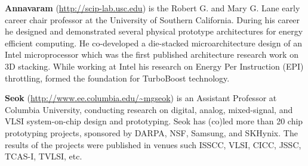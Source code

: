 \vspace{3pt}
\noindent
\textbf{Annavaram} (\url{http://scip-lab.usc.edu}) is the Robert G. and Mary G. Lane early career chair professor at the University of Southern California. 
During his career he designed and demonstrated several physical prototype architectures for energy efficient computing. 
He co-developed a die-stacked microarchitecture design of an Intel microprocessor which was the first published architecture research work on 3D stacking. 
While working at Intel his research on Energy Per Instruction (EPI) throttling, formed the foundation for TurboBoost technology.

\vspace{3pt}
\noindent
\textbf{Seok} (\url{http://www.ee.columbia.edu/~mgseok}) is an Assistant Professor at Columbia University, conducting research on digital, analog, mixed-signal, and VLSI system-on-chip design and prototyping. 
Seok has (co)led more than 20 chip prototyping projects, sponsored by DARPA, NSF, Samsung, and SKHynix. 
The results of the projects were published in venues such  ISSCC, VLSI, CICC, JSSC, TCAS-I, TVLSI, etc.
